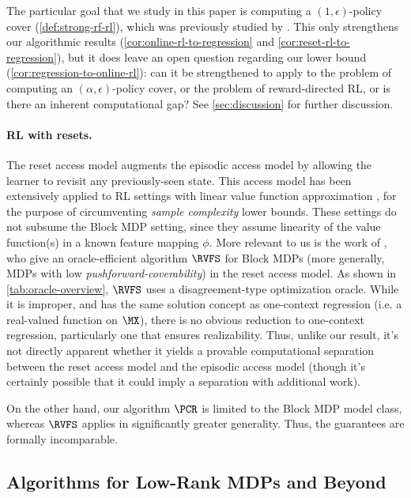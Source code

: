 The particular goal that we study in this paper is computing a $(1,\epsilon)$-policy cover (\cref{def:strong-rf-rl}), which was previously studied by \cite{du2019provably}. This only strengthens our algorithmic results (\cref{cor:online-rl-to-regression} and \cref{cor:reset-rl-to-regression}), but it does leave an open question regarding our lower bound (\cref{cor:regression-to-online-rl}): can it be strengthened to apply to the problem of computing an $(\alpha,\epsilon)$-policy cover, or the problem of reward-directed RL, or is there an inherent computational gap? See \cref{sec:discussion} for further discussion.

\paragraph{RL with resets.} The reset access model augments the episodic access model by allowing the learner to revisit any previously-seen state. This access model has been extensively applied to RL settings with linear value function approximation \citep{weisz2021query,li2021sample,yin2022efficient}, for the purpose of circumventing \emph{sample complexity} lower bounds. These settings do not subsume the Block MDP setting, since they assume linearity of the value function(s) in a known feature mapping $\phi$. More relevant to us is the work of \cite{mhammedi2024power}, who give an oracle-efficient algorithm $\RVFS$ for Block MDPs (more generally, MDPs with low \emph{pushforward-coverability}) in the reset access model. As shown in \cref{tab:oracle-overview}, $\RVFS$ uses a disagreement-type optimization oracle. While it is improper, and has the same solution concept as one-context regression (i.e. a real-valued function on $\MX$), there is no obvious reduction to one-context regression, particularly one that ensures realizability. Thus, unlike our result, it's not directly apparent whether it yields a provable computational separation between the reset access model and the episodic access model (though it's certainly possible that it could imply a separation with additional work).\loose

On the other hand, our algorithm $\PCR$ is limited to the Block MDP model class, whereas $\RVFS$ applies in significantly greater generality. Thus, the guarantees are formally incomparable.

\subsection{Algorithms for Low-Rank MDPs and Beyond}\label{sec:related-alg-low-rank}

